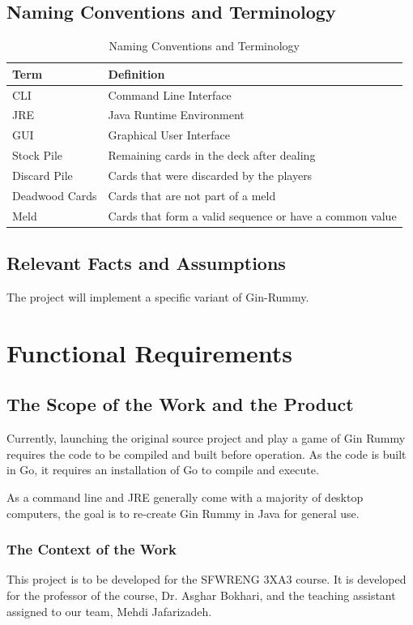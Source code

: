 \documentclass[12pt, titlepage]{article}
\begin{document}
\subsection{Naming Conventions and Terminology}
\begin{table}[H]
\caption{Naming Conventions and Terminology}
    \centering
    \begin{tabular}{ |p{5cm}|p{7.5cm}| }
    \hline
    \textbf{Term} & \textbf{Definition} \\
    \hline
    CLI & Command Line Interface \\
    \hline
    JRE & Java Runtime Environment \\
    \hline
    GUI & Graphical User Interface \\
    \hline
    Stock Pile & Remaining cards in the deck after dealing \\
    \hline
    Discard Pile & Cards that were discarded by the players \\
    \hline
    Deadwood Cards & Cards that are not part of a meld \\
    \hline
    Meld & Cards that form a valid sequence or have a common value \\
    \hline
    \end{tabular}
\end{table}

\subsection{Relevant Facts and Assumptions}

The project will implement a specific variant of Gin-Rummy. \cite{ginRuleSet}

\section{Functional Requirements}
\subsection{The Scope of the Work and the Product}
Currently, launching the original source project and play a game of Gin Rummy requires the code to be compiled and built before operation. As the code is built in Go, it requires an installation of Go to compile and execute. \cite{ogSource}

As a command line and JRE generally come with a majority of desktop computers, the goal is to re-create Gin Rummy in Java for general use.
\subsubsection{The Context of the Work}
This project is to be developed for the SFWRENG 3XA3 course. It is developed for the professor of the course, Dr. Asghar Bokhari, and the teaching assistant assigned to our team, Mehdi Jafarizadeh.
\end{document}

